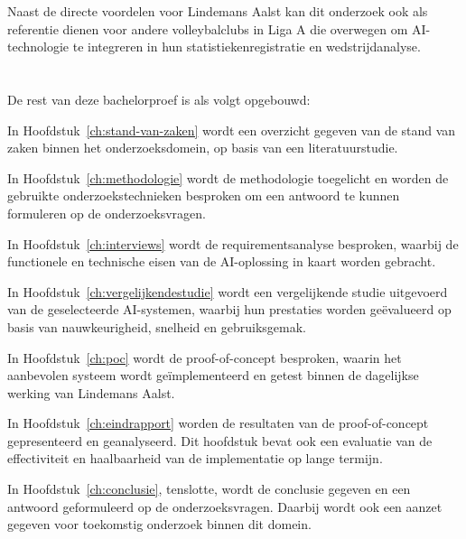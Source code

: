 Naast de directe voordelen voor Lindemans Aalst kan dit onderzoek ook als referentie dienen voor andere volleybalclubs in Liga A die overwegen om AI-technologie te integreren in hun statistiekenregistratie en wedstrijdanalyse.

\section{}%
\label{sec:opzet-bachelorproef}


De rest van deze bachelorproef is als volgt opgebouwd:

In Hoofdstuk~\ref{ch:stand-van-zaken} wordt een overzicht gegeven van de stand van zaken binnen het onderzoeksdomein, op basis van een literatuurstudie.

In Hoofdstuk~\ref{ch:methodologie} wordt de methodologie toegelicht en worden de gebruikte onderzoekstechnieken besproken om een antwoord te kunnen formuleren op de onderzoeksvragen.

In Hoofdstuk~\ref{ch:interviews} wordt de requirementsanalyse besproken, waarbij de functionele en technische eisen van de AI-oplossing in kaart worden gebracht.

In Hoofdstuk~\ref{ch:vergelijkendestudie} wordt een vergelijkende studie uitgevoerd van de geselecteerde AI-systemen, waarbij hun prestaties worden geëvalueerd op basis van nauwkeurigheid, snelheid en gebruiksgemak.	

In Hoofdstuk~\ref{ch:poc} wordt de proof-of-concept besproken, waarin het aanbevolen systeem wordt geïmplementeerd en getest binnen de dagelijkse werking van Lindemans Aalst.

In Hoofdstuk~\ref{ch:eindrapport} worden de resultaten van de proof-of-concept gepresenteerd en geanalyseerd. Dit hoofdstuk bevat ook een evaluatie van de effectiviteit en haalbaarheid van de implementatie op lange termijn.

In Hoofdstuk~\ref{ch:conclusie}, tenslotte, wordt de conclusie gegeven en een antwoord geformuleerd op de onderzoeksvragen. Daarbij wordt ook een aanzet gegeven voor toekomstig onderzoek binnen dit domein.